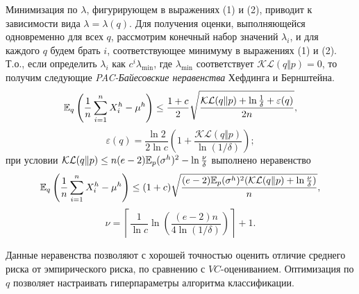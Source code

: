 \begin{remark}
Минимизация по $\lambda$, фигурирующем в выражениях (1) и (2), приводит к зависимости вида $\lambda = \lambda(q)$. Для получения оценки, выполняющейся одновременно для всех $q$, рассмотрим конечный набор значений $\lambda_i$, и для каждого $q$ будем брать $i$, соответствующее минимуму в выражениях (1) и (2). Т.о., если определить $\lambda_i$ как $c^i \lambda_{\min}$, где $\lambda_{\min}$ соответствует $\mathcal{KL} (q \Vert p) = 0$, то получим следующие \textit{PAC-Байесовские неравенства} Хефдинга и Бернштейна.
\[
\mathrm{{\mathbb E}}_q \left( 
\frac{1}{n} \sum_{i=1}^n X_i^h - \mu^h
\right) \leq
\frac{1+c}{2}
\sqrt{
\frac{\mathcal{KL} (q \Vert p) + \ln \frac{1}{\delta} + \varepsilon(q) }{2 n} 
},
\]
\[
\varepsilon(q) = \frac{\ln 2}{2 \ln c} \left(
1 + \frac{\mathcal{KL} (q \Vert p) }{\ln (1/\delta) }
\right);
\]
при условии
$\mathcal{KL} (q \Vert p) \leq n  (e-2) \mathrm{{\mathbb E}}_p (\sigma^h)^2  -  \ln \frac{\nu}{\delta}$ выполнено неравенство
\[
\mathrm{{\mathbb E}}_q \left( 
\frac{1}{n} \sum_{i=1}^n X_i^h - \mu^h
\right) \leq
(1 + c)
\sqrt{
\frac{ (e-2) \mathrm{{\mathbb E}}_p (\sigma^h)^2 (\mathcal{KL} (q \Vert p) + \ln \frac{\nu}{\delta})  }{n} 
},
 \]
 \[
 \nu  = \left\lceil \frac{1}{\ln c} \ln \left( \frac{(e-2)n}{4\ln(1/\delta)} \right) \right\rceil + 1.
 \]   
   
Данные неравенства позволяют с хорошей точностью оценить отличие среднего риска от эмпирического риска, по сравнению с $VC$-оцениванием. Оптимизация  по $q$ позволяет настраивать гиперпараметры алгоритма классификации.     
\end{remark}



